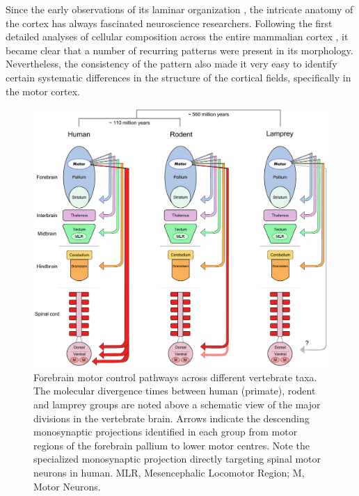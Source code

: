 Since the early observations of its laminar organization \cite{Baillarger1840}, the intricate anatomy of the cortex has always fascinated neuroscience researchers. Following the first detailed analyses of cellular composition across the entire mammalian cortex \cite{Campbell1905,Brodmann1909}, it became clear that a number of recurring patterns were present in its morphology. Nevertheless, the consistency of the pattern also made it very easy to identify certain systematic differences in the structure of the cortical fields, specifically in the motor cortex.

\begin{figure}
\begin{center}
\includegraphics[width=\columnwidth]{chapters/figuresChTeleology/descendingTaxa}
\end{center}
\vspace{-5mm}
\caption{Forebrain motor control pathways across different vertebrate taxa. The molecular divergence times between human (primate), rodent and lamprey groups \protect\cite{Kumar1998} are noted above a schematic view of the major divisions in the vertebrate brain. Arrows indicate the descending monosynaptic projections identified in each group from motor regions of the forebrain pallium to lower motor centres. Note the specialized monosynaptic projection directly targeting spinal motor neurons in human. MLR, Mesencephalic Locomotor Region; M, Motor Neurons.}
\label{fig:descendingTaxa}
\end{figure}

